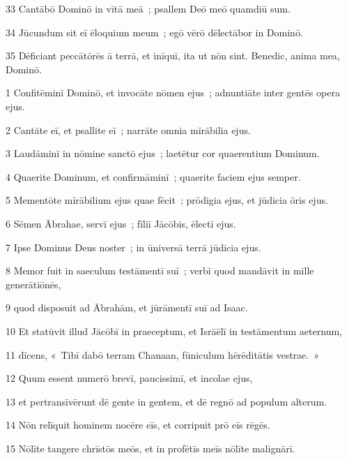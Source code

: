 \psalmVerse
  {\phantom{0}33}
  {Cantābō Dominō in vītā meā~; psallem Deō meō quamdiū sum.}


\psalmVerse
  {\phantom{0}34}
  {Jūcundum sit eī ēloquium meum~; egō vērō dēlectābor in Dominō.}


\psalmVerse
  {\phantom{0}35}
  {Dēficiant peccātōrēs ā terrā, et inīquī, ita ut nōn sint. Benedic, anima mea, Dominō.}




\psalmVerse
  {\phantom{00}1}
  {Confitēminī Dominō, et invocāte nōmen ejus~; adnuntiāte inter gentēs opera ejus.}


\psalmVerse
  {\phantom{00}2}
  {Cantāte eī, et psallite eī~; narrāte omnia mīrābilia ejus.}


\psalmVerse
  {\phantom{00}3}
  {Laudāminī in nōmine sanctō ejus~; laetētur cor quaerentium Dominum.}


\psalmVerse
  {\phantom{00}4}
  {Quaerite Dominum, et confirmāminī~; quaerite faciem ejus semper.}


\psalmVerse
  {\phantom{00}5}
  {Mementōte mīrābilium ejus quae fēcit~; prōdigia ejus, et jūdicia ōris ejus.}


\psalmVerse
  {\phantom{00}6}
  {Sēmen Ābrahae, servī ejus~; fīliī Jācōbis, ēlectī ejus.}


\psalmVerse
  {\phantom{00}7}
  {Ipse Dominus Deus noster~; in ūniversā terrā jūdicia ejus.}


\psalmVerse
  {\phantom{00}8}
  {Memor fuit in saeculum testāmentī suī~; verbī quod mandāvit in mille generātiōnēs,}


\psalmVerse
  {\phantom{00}9}
  {quod disposuit ad Ābrahām, et jūrāmentī suī ad Isaac.}


\psalmVerse
  {\phantom{0}10}
  {Et statūvit illud Jācōbī in praeceptum, et Isrāēlī in testāmentum aeternum,}


\psalmVerse
  {\phantom{0}11}
  {dīcens, «~Tibī dabō terram Chanaan, fūniculum hērēditātis vestrae.~»}


\psalmVerse
  {\phantom{0}12}
  {Quum essent numerō brevī, paucissimī, et incolae ejus,}


\psalmVerse
  {\phantom{0}13}
  {et pertransīvērunt dē gente in gentem, et dē regnō ad populum alterum.}


\psalmVerse
  {\phantom{0}14}
  {Nōn relīquit hominem nocēre eīs, et corripuit prō eīs rēgēs.}


\psalmVerse
  {\phantom{0}15}
  {Nōlīte tangere chrīstōs meōs, et in profētīs meīs nōlīte malignārī.}


